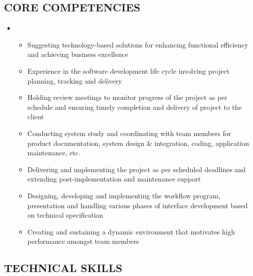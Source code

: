 \documentclass[]{article}
\begin{document}
\subsection{CORE COMPETENCIES}\label{core-competencies}

\begin{itemize}
\item
  \begin{itemize}
  \itemsep1pt\parskip0pt
  \item
    Suggesting technology-based solutions for enhancing functional
    efficiency and achieving business excellence
  \item
    Experience in the software development life cycle involving project
    planning, tracking and delivery
  \item
    Holding review meetings to monitor progress of the project as per
    schedule and ensuring timely completion and delivery of project to
    the client
  \item
    Conducting system study and coordinating with team members for
    product documentation, system design \& integration, coding,
    application maintenance, etc.
  \item
    Delivering and implementing the project as per scheduled deadlines
    and extending post-implementation and maintenance support
  \item
    Designing, developing and implementing the workflow program,
    presentation and handling various phases of interface development
    based on technical specification
  \item
    Creating and sustaining a dynamic environment that motivates high
    performance amongst team members
  \end{itemize}
\end{itemize}

\subsection{TECHNICAL SKILLS}\label{technical-skills}
\end{document}
